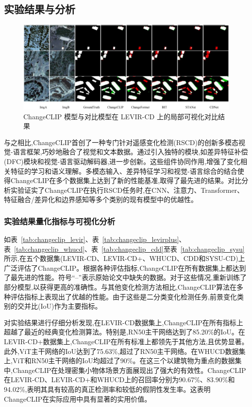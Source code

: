 \subsection{实验结果与分析}

\begin{figure}[!htbp]
  \centering
  \includegraphics[width=\textwidth]{paper_figures/基于AI基础模型微调的变化检测模型研究/ChangeCLIP/changeclip_levir.png}
  \caption{ChangeCLIP 模型与对比模型在 LEVIR-CD 上的局部可视化对比结果}
  \label{fig:changeclip_levir}
\end{figure}

与之相比,ChangeCLIP首创了一种专门针对遥感变化检测(RSCD)的创新多模态视觉-语言框架,巧妙地融合了视觉和文本数据。通过引入独特的模块,如差异特征补偿(DFC)模块和视觉-语言驱动解码器,进一步创新。这些组件协同作用,增强了变化相关特征的学习和语义理解。多模态输入、差异特征学习和视觉-语言综合的结合使得ChangeCLIP在多个数据集上达到了新的性能基准,取得了最先进的结果。对比分析实验证实了ChangeCLIP在执行RSCD任务时,在CNN、注意力、Transformer、特征融合/差异化和边界感知等多个类别的现有模型中的优越性。

\subsubsection{实验结果量化指标与可视化分析}

如表~\ref{tab:changeclip_levir}、表~\ref{tab:changeclip_levirplus}、表~\ref{tab:changeclip_whucd}、表~\ref{tab:changeclip_cdd}至表~\ref{tab:changeclip_sysu}所示,在五个数据集(LEVIR-CD、LEVIR-CD+、WHUCD、CDD和SYSU-CD)上广泛评估了ChangeCLIP。根据各种评估指标,ChangeCLIP在所有数据集上都达到了最先进的性能。符号``--''表示原始论文中缺失的数据。对于这些情况,重新训练了部分模型,以获得更高的准确性。与其他变化检测方法相比,ChangeCLIP算法在多种评估指标上表现出了优越的性能。由于这些是二分类变化检测任务,前景变化类别的交并比(IoU)作为主要指标。

对实验结果进行仔细分析发现,在LEVIR-CD数据集上,ChangeCLIP在所有指标上超越了最近的经典变化检测算法。特别是,RN50主干网络达到了85.20\%的IoU。在LEVIR-CD+数据集上,ChangeCLIP在所有标准上都领先于其他方法,且优势显著。此外,ViT主干网络的IoU达到了75.63\%,超过了RN50主干网络。在WHUCD数据集上,ViT和RN50主干网络的IoU均超过了90\%。在这三个以建筑物为重点的数据集中,ChangeCLIP在处理密集小物体场景方面展现出了强大的有效性。ChangeCLIP在LEVIR-CD、LEVIR-CD+和WHUCD上的召回率分别为90.67\%、83.90\%和94.02\%,表明其具有较高的真正检测率和较低的假阴性发生率。这表明ChangeCLIP在实际应用中具有显著的实用价值。

